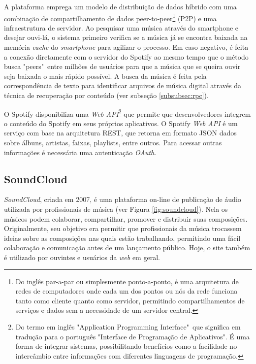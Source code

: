 A plataforma emprega um modelo de distribuição de dados híbrido com uma combinação de compartilhamento de dados peer-to-peer\footnote{Do inglês par-a-par ou simplesmente ponto-a-ponto, é uma arquitetura de redes de computadores onde cada um dos pontos ou nós da rede funciona tanto como cliente quanto como servidor, permitindo compartilhamentos de serviços e dados sem a necessidade de um servidor central.} (P2P) e uma infraestrutura de servidor. Ao pesquisar uma música através do smartphone e desejar ouvi-lá, o sistema primeiro verifica se a música já se encontra baixada na memória \textit{cache} do \textit{smartphone} para agilizar o processo. Em caso negativo, é feita a conexão diretamente com o servidor do Spotify ao mesmo tempo que o método busca "peers"\ entre milhões de usuários para que a música que se queira ouvir seja baixada o mais rápido possível. A busca da música é feita pela correspondência de texto para identificar arquivos de música digital através da técnica de recuperação por conteúdo (ver subseção \ref{subsubsec:rpc}).

O Spotify disponibiliza uma \textit{Web API}\footnote{Do termo em inglês "Application Programming Interface"\ que significa em tradução para o português "Interface de Programação de Aplicativos". É uma forma de integrar sistemas, possibilitando benefícios como a facilidade no intercâmbio entre informações com diferentes linguagens de programação.} que permite que desenvolvedores integrem o conteúdo do Spotify em seus próprios aplicativos. O Spotify \textit{Web API} é um serviço com base na arquitetura REST, que retorna em formato JSON dados sobre álbuns, artistas, faixas, playlists, entre outros. Para acessar outras informações é necessária uma autenticação \textit{OAuth}.

\subsection{SoundCloud} \label{subsec:soundcloud}
\textit{SoundCloud}, criada em 2007, é uma plataforma on-line de publicação de áudio utilizada por profissionais de música (ver Figura \ref{fig:soundcloud}). Nela os músicos podem colaborar, compartilhar, promover e distribuir suas composições.
Originalmente, seu objetivo era permitir que profissionais da música trocassem ideias sobre as composições nas quais estão trabalhando, permitindo uma fácil colaboração e comunicação antes de um lançamento público. Hoje, o site também é utilizado por ouvintes e usuários da \textit{web} em geral.


